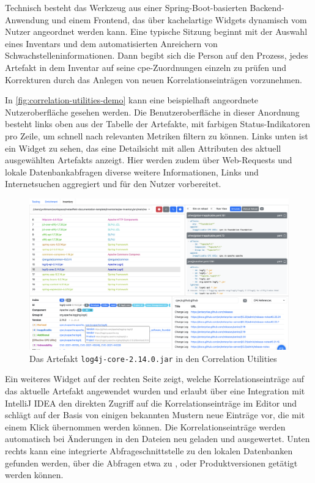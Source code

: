 Technisch besteht das Werkzeug aus einer Spring-Boot-basierten Backend-Anwendung und einem Frontend, das über kachelartige Widgets dynamisch vom Nutzer angeordnet werden kann.
Eine typische Sitzung beginnt mit der Auswahl eines Inventars und dem automatisierten Anreichern von Schwachstelleninformationen.
Dann begibt sich die Person auf den Prozess, jedes Artefakt in dem Inventar auf seine \acrshort{cpe}-Zuordnungen einzeln zu prüfen und Korrekturen durch das Anlegen von neuen Korrelationseinträgen vorzunehmen.

In \autoref{fig:correlation-utilities-demo} kann eine beispielhaft angeordnete Nutzeroberfläche gesehen werden.
Die Benutzeroberfläche in dieser Anordnung besteht links oben aus der Tabelle der Artefakte, mit farbigen Status-Indikatoren pro Zeile, um schnell nach relevanten Metriken filtern zu können.
Links unten ist ein Widget zu sehen, das eine Detailsicht mit allen Attributen des aktuell ausgewählten Artefakts anzeigt.
Hier werden zudem über Web-Requests und lokale Datenbankabfragen diverse weitere Informationen, Links und Internetsuchen aggregiert und für den Nutzer vorbereitet.

\begin{landscape}
    \begin{figure}
        \centering
        \includegraphics[keepaspectratio,width=\linewidth]{../../images/correlation-utilities-demo}
        \caption{Das Artefakt \texttt{log4j-core-2.14.0.jar} in den Correlation Utilities}
        \label{fig:correlation-utilities-demo}
    \end{figure}
\end{landscape}

Ein weiteres Widget auf der rechten Seite zeigt, welche Korrelationseinträge auf das aktuelle Artefakt angewendet wurden und erlaubt über eine Integration mit IntelliJ IDEA den direkten Zugriff auf die Korrelationseinträge im Editor und schlägt auf der Basis von einigen bekannten Mustern neue Einträge vor, die mit einem Klick übernommen werden können.
Die Korrelationseinträge werden automatisch bei Änderungen in den Dateien neu geladen und ausgewertet.
Unten rechts kann eine integrierte Abfrageschnittstelle zu den lokalen Datenbanken gefunden werden, über die Abfragen etwa zu ,  oder Produktversionen getätigt werden können.

